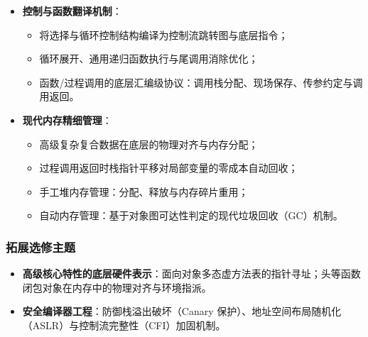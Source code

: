 \begin{itemize}
\begin{itemize}
        \item 全局静态数据段、代码只读段、动态调用栈与动态增长堆区。
    \end{itemize}
    \item \textbf{控制与函数翻译机制}：
    \begin{itemize}
        \item 将选择与循环控制结构编译为控制流跳转图与底层指令；
        \item 循环展开、通用递归函数执行与尾调用消除优化；
        \item 函数/过程调用的底层汇编级协议：调用栈分配、现场保存、传参约定与调用返回。
    \end{itemize}
    \item \textbf{现代内存精细管理}：
    \begin{itemize}
        \item 高级复杂复合数据在底层的物理对齐与内存分配；
        \item 过程调用返回时栈指针平移对局部变量的零成本自动回收；
        \item 手工堆内存管理：分配、释放与内存碎片重用；
        \item 自动内存管理：基于对象图可达性判定的现代垃圾回收（GC）机制。
    \end{itemize}
\end{itemize}

\subsubsection{拓展选修主题}
\begin{itemize}
    \item \textbf{高级核心特性的底层硬件表示}：面向对象多态虚方法表的指针寻址；头等函数闭包对象在内存中的物理对齐与环境指派。
    \item \textbf{安全编译器工程}：防御栈溢出破坏（Canary 保护）、地址空间布局随机化（ASLR）与控制流完整性（CFI）加固机制。
\end{itemize}

